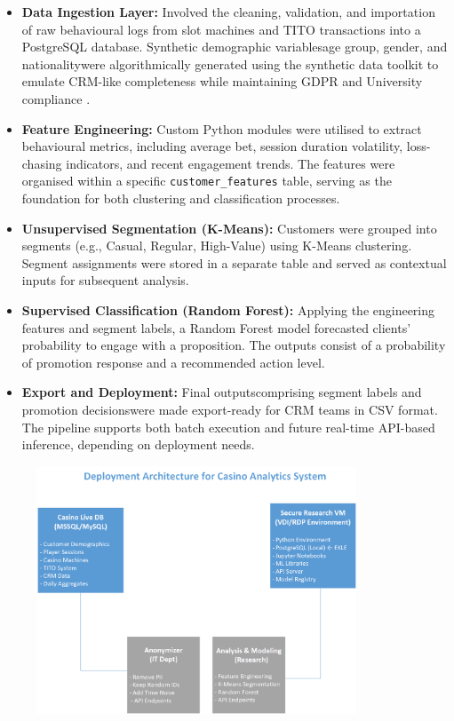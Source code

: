 \documentclass[12pt,a4paper]{report}
\begin{document}
\begin{itemize}
    \item \textbf{Data Ingestion Layer:} Involved the cleaning, validation, and importation of raw behavioural logs from slot machines and TITO transactions into a PostgreSQL database. Synthetic demographic variablesage group, gender, and nationalitywere algorithmically generated using the synthetic data toolkit to emulate CRM-like completeness while maintaining GDPR and University compliance \citep{faker2025}.

    \item \textbf{Feature Engineering:} Custom Python modules were utilised to extract behavioural metrics, including average bet, session duration volatility, loss-chasing indicators, and recent engagement trends. The features were organised within a specific \texttt{customer\_features} table, serving as the foundation for both clustering and classification processes.

    \item \textbf{Unsupervised Segmentation (K-Means):} Customers were grouped into segments (e.g., Casual, Regular, High-Value) using K-Means clustering. Segment assignments were stored in a separate table and served as contextual inputs for subsequent analysis.

    \item \textbf{Supervised Classification (Random Forest):} Applying the engineering features and segment labels, a Random Forest model forecasted clients' probability to engage with a proposition.  The outputs consist of a probability of promotion response and a recommended action level.

    \item \textbf{Export and Deployment:} Final outputscomprising segment labels and promotion decisionswere made export-ready for CRM teams in CSV format. The pipeline supports both batch execution and future real-time API-based inference, depending on deployment needs.

\end{itemize}

\begin{figure}[H]
\centering
\includegraphics[width=0.85\textwidth]{figures/casino_analytics_system.png}
\label{fig:deployment-architecture}
\end{figure}
\end{document}
